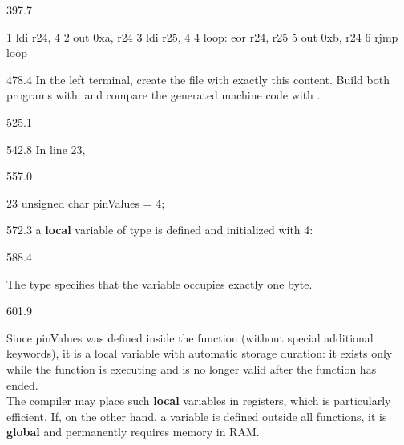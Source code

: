 \documentclass{aslab}
\makeatletter
\newcommand*\aN[1]{\textcolor{codeorange}{#1}}%
\newcommand*\aI[1]{\textcolor{codegreen}{#1}}%
\newcommand*\aK[1]{\textcolor{codered}{#1}}%
\newcommand*\aR[1]{\textcolor{codecyan}{#1}}%
\newenvironment{asmlisting}[1][11]{\par
  \edef\asm@bs{\the\baselineskip}\fontsize{#1bp}{\asm@bs}\selectfont
  \ttfamily\asm@setup}{\par}
\makeatother
\begin{document}
\begin{region}[x=74.7,right=0,pitch=11]{397.7}
\begin{asmlisting}[9]
\aN{1}         \aI{ldi}     \aR{r24},    \aK{4}
\aN{2}         \aI{out}     \aK{0xa},    \aR{r24}
\aN{3}         \aI{ldi}     \aR{r25},    \aK{4}
\aN{4 loop}:   \aI{eor}     \aR{r24},    \aR{r25}
\aN{5}         \aI{out}     \aK{0xb},    \aR{r24}
\aN{6}         \aI{rjmp}    \aR{loop}
\end{asmlisting}
\end{region}

\begin{region}[x=74.7,right=0,pitch=13.5]{478.4}
In the left terminal, create the file  with exactly this
content. Build both programs with: 
and compare the generated machine code with .
\end{region}

\begin{region}{525.1}
\end{region}

\begin{region}{542.8}
In line 23,
\end{region}

\begin{region}{557.0}
\begin{asmlisting}[9]
\aN{23}     \aI{unsigned} \aI{char} pinValues = \aK{4};
\end{asmlisting}
\end{region}

\begin{region}{572.3}
a \textbf{local} variable of type  is defined and
initialized with 4:
\end{region}

\begin{region}{588.4}
\begin{bullets}
\item The type  specifies that the variable occupies
  exactly one byte.
\end{bullets}
\end{region}

\begin{region}[pitch=13.84]{601.9}
\begin{bullets}
\item Since pinValues was defined inside the function  (without
  special additional keywords), it is a local variable with automatic
  storage duration: it exists only while the function is executing and is
  no longer valid after the function has ended.\\
  The compiler may place such \textbf{local} variables in registers, which
  is particularly efficient. If, on the other hand, a variable is defined
  outside all functions, it is \textbf{global} and permanently requires
  memory in RAM.
\end{bullets}
\end{region}
\end{document}
